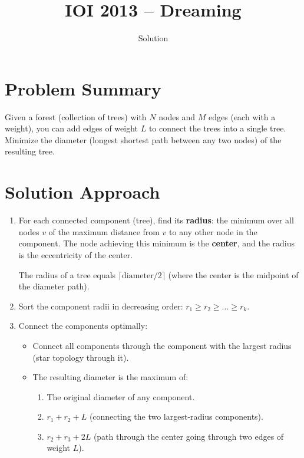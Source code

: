 \documentclass[11pt,a4paper]{article}
\title{IOI 2013 -- Dreaming}
\author{Solution}
\date{}
\begin{document}
\maketitle

\section{Problem Summary}
Given a forest (collection of trees) with $N$ nodes and $M$ edges (each with a weight), you can add edges of weight $L$ to connect the trees into a single tree. Minimize the diameter (longest shortest path between any two nodes) of the resulting tree.

\section{Solution Approach}
\begin{enumerate}
    \item For each connected component (tree), find its \textbf{radius}: the minimum over all nodes $v$ of the maximum distance from $v$ to any other node in the component. The node achieving this minimum is the \textbf{center}, and the radius is the eccentricity of the center.

    The radius of a tree equals $\lceil \text{diameter} / 2 \rceil$ (where the center is the midpoint of the diameter path).

    \item Sort the component radii in decreasing order: $r_1 \geq r_2 \geq \ldots \geq r_k$.

    \item Connect the components optimally:
    \begin{itemize}
        \item Connect all components through the component with the largest radius (star topology through it).
        \item The resulting diameter is the maximum of:
        \begin{enumerate}
            \item The original diameter of any component.
            \item $r_1 + r_2 + L$ (connecting the two largest-radius components).
            \item $r_2 + r_3 + 2L$ (path through the center going through two edges of weight $L$).
        \end{enumerate}
    \end{itemize}
\end{enumerate}
\end{document}
